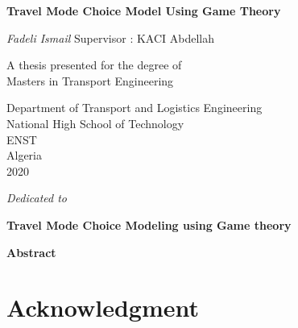 \documentclass[12pt]{report}
\newenvironment{dedication}
  {\clearpage           %
   \thispagestyle{empty}%
   \vspace*{\stretch{1}}%
   \itshape             %
   \raggedleft          %
  }
  {\par %
   \vspace{\stretch{3}} %
   \clearpage           %
  }
\def\blankpage{%
      \clearpage%
      \thispagestyle{empty}%
      \addtocounter{page}{-1}%
      \null%
      \clearpage}
\begin{document}
\begin{titlepage}

   \begin{center}
   \thisfancypage{%
\setlength{\fboxsep}{10pt}\doublebox}{}
       \vspace*{1cm}
 	   \Huge
       \textbf{Travel Mode Choice Model Using Game Theory}
		\LARGE
		
       \vspace{0.5cm}
        
            
       \vspace{1.5cm}

       \textit{Fadeli Ismail}
\vfill
\normalsize
Supervisor : KACI Abdellah\\

       \vfill
       
            	\normalsize
       A thesis presented for the degree of\\
       Masters in Transport Engineering
            
       \vspace{0.8cm}
     
       
            \Large
       Department of Transport and Logistics Engineering\\
       National High School of Technology \\
       ENST\\
       Algeria\\
       2020
            
   \end{center}
   

\end{titlepage}
\blankpage
\begin{dedication}\thispagestyle{empty}
Dedicated to 
\end{dedication}
\clearpage
\thispagestyle{empty}
\thispagestyle{plain}
\begin{center}
    \Large
    \textbf{Travel Mode Choice Modeling using Game theory}
        
    \vspace{0.4cm}
    \large
   
        
    \vspace{0.4cm}
    
       
    \vspace{0.9cm}
    \textbf{Abstract}
\end{center}

\clearpage
\section*{Acknowledgment}\thispagestyle{empty}
\clearpage
\tableofcontents \thispagestyle{empty}
\listoffigures
\listoftables
{}
\clearpage
\end{document}
